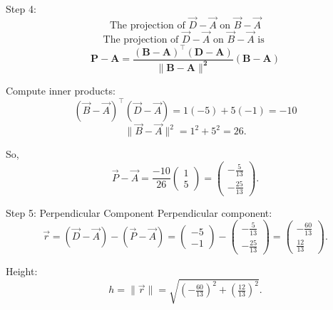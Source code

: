 \documentclass{beamer}
\begin{document}
\begin{frame}
{Step 4: \[
\text{The projection of }\vec{D}-\vec{A}\text{ on }\vec{B}-\vec{A} 
\]}
\[
\text{The projection of }\vec{D}-\vec{A}\text{ on }\vec{B}-\vec{A}\text{ is } 
\]
\begin{equation}
\mathbf{P-A = \frac{(B-A)^\top (D-A)}{\|B-A\|^2} (B-A)}
\end{equation}

Compute inner products:
\begin{equation}
(\vec B-\vec A)^\top(\vec D-\vec A)=1(-5)+5(-1)=-10
\end{equation}
\begin{equation}
\|\vec B-\vec A\|^2=1^2+5^2=26.
\end{equation}

So,
\begin{equation}
\vec P-\vec A
=\frac{-10}{26}\begin{pmatrix}1\\5\end{pmatrix}
=\begin{pmatrix}-\tfrac{5}{13}\\[4pt]-\tfrac{25}{13}\end{pmatrix}.
\end{equation}
\end{frame}

\begin{frame}{Step 5: Perpendicular Component}
Perpendicular component:
\begin{equation}
\vec r=(\vec D-\vec A)-(\vec P-\vec A)
=\begin{pmatrix}-5\\-1\end{pmatrix}
-\begin{pmatrix}-\tfrac{5}{13}\\[4pt]-\tfrac{25}{13}\end{pmatrix}
=\begin{pmatrix}-\tfrac{60}{13}\\[4pt]\tfrac{12}{13}\end{pmatrix}.
\end{equation}

Height:
\begin{equation}
h=\|\vec r\|
=\sqrt{\left(-\tfrac{60}{13}\right)^2+\left(\tfrac{12}{13}\right)^2}.
\end{equation}
\end{frame}
\end{document}
